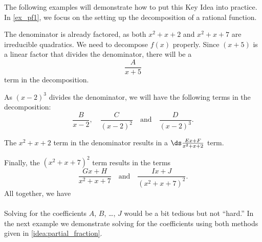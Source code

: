 The following examples will demonstrate how to put this Key Idea into practice. In \autoref{ex_pf1}, we focus on the setting up the decomposition of a rational function.

{The denominator is already factored, as both $x^2+x+2$ and $x^2+x+7$ are irreducible quadratics. We need to decompose $f(x)$ properly. Since $(x+5)$ is a linear factor that divides the denominator, there will be a
\[\frac{A}{x+5}\]
term in the decomposition.

As $(x-2)^3$ divides the denominator, we will have the following terms in the decomposition:
$$\frac{B}{x-2},\quad \frac{C}{(x-2)^2}\quad \text{and}\quad \frac{D}{(x-2)^3}.$$

The $x^2+x+2$ term in the denominator results in a $\ds\frac{Ex+F}{x^2+x+2}$ term.

Finally, the $(x^2+x+7)^2$ term results in the terms $$\frac{Gx+H}{x^2+x+7}\quad \text{and}\quad \frac{Ix+J}{(x^2+x+7)^2}.$$
All together, we have\\
\\
Solving for the coefficients $A$, $B$, \ldots, $J$ would be a bit tedious but not ``hard.''  In the next example we demonstrate solving for the coefficients using both methods given in \autoref{idea:partial_fraction}.}


